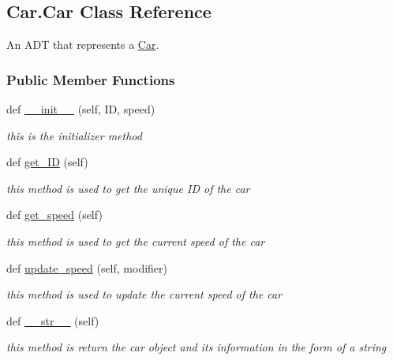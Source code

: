 \hypertarget{class_car_1_1_car}{}\subsection{Car.\+Car Class Reference}
\label{class_car_1_1_car}


An A\+DT that represents a \mbox{\hyperlink{class_car_1_1_car}{Car}}.  


\subsubsection*{Public Member Functions}
\begin{DoxyCompactItemize}
\item 
\mbox{\label{class_car_1_1_car_acc4aad320460188f5900f542894734a8}} 
def \mbox{\hyperlink{class_car_1_1_car_acc4aad320460188f5900f542894734a8}{\+\_\+\+\_\+init\+\_\+\+\_\+}} (self, ID, speed)
\begin{DoxyCompactList}\small\item\em this is the initializer method \end{DoxyCompactList}\item 
def \mbox{\hyperlink{class_car_1_1_car_a6127c1de64360a8a877bbc0e868b2656}{get\+\_\+\+ID}} (self)
\begin{DoxyCompactList}\small\item\em this method is used to get the unique ID of the car \end{DoxyCompactList}\item 
def \mbox{\hyperlink{class_car_1_1_car_a1f2c5f15b6bffe9e644da70b1b9136ae}{get\+\_\+speed}} (self)
\begin{DoxyCompactList}\small\item\em this method is used to get the current speed of the car \end{DoxyCompactList}\item 
def \mbox{\hyperlink{class_car_1_1_car_ac15a58819007bcae44278a783105d7e9}{update\+\_\+speed}} (self, modifier)
\begin{DoxyCompactList}\small\item\em this method is used to update the current speed of the car \end{DoxyCompactList}\item 
def \mbox{\hyperlink{class_car_1_1_car_adf7632b1116c6adc700293716c383323}{\+\_\+\+\_\+str\+\_\+\+\_\+}} (self)
\begin{DoxyCompactList}\small\item\em this method is return the car object and it\textquotesingle{}s information in the form of a string \end{DoxyCompactList}\end{DoxyCompactItemize}
